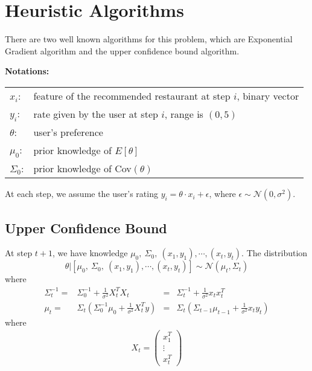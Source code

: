 \documentclass{article}
\theoremstyle{plain}
\theoremstyle{definition}
\begin{document}


\section{Heuristic Algorithms}
There are two well known algorithms for this problem, which are Exponential Gradient algorithm and the upper confidence bound algorithm.\

\textbf{Notations: }

\begin{center}
\begin{tabular}{ll}
${x}_i$: & feature of the recommended restaurant at step $i$, binary vector\\
$y_i$: & rate given by the user at step $i$, range is $(0,5)$\\
${\theta}$: & user's preference\\
${\mu_0}$: & prior knowledge of ${E}[{\theta}]$ \\
$\Sigma_0$: & prior knowledge of Cov$(\theta)$
\end{tabular}
\end{center}

At each step, we assume the user's rating $y_i = \theta\cdot {x}_i+\epsilon$, where $\epsilon\sim\mathcal{N}(0,\sigma^2)$.

\subsection{Upper Confidence Bound}
At step $t+1$, we have knowledge $\mu_0,\ \Sigma_0,\ ({x}_1, y_1), \cdots, ({x}_{t}, y_t)$. The distribution 
\[\theta | [ \mu_0,\ \Sigma_0,\ ({x}_1, y_1), \cdots, ({x}_{t}, y_t) ] \sim \mathcal{N}(\mu_{t}, \Sigma_{t}) \]
where 
\begin{align}
\Sigma_{t}^{-1} = & \Sigma_0^{-1}+\frac{1}{\sigma^2}X_t^TX_t &=& \Sigma_t^{-1} + \frac{1}{\sigma^2}{x}_t{x}_t^T\\
\mu_t = & \Sigma_t\left( \Sigma_0^{-1}\mu_0 + \frac{1}{\sigma^2}X_t^Ty \right) &= &\Sigma_t\left(\Sigma_{t-1}\mu_{t-1}+\frac{1}{\sigma^2}{x}_t y_t\right)
\end{align}
where 
\begin{align*}
X_t = \left(
\begin{array}{c}
{x}_1^T\\
\vdots\\
{x}_t^T
\end{array}\right)
\end{align*}
\end{document}
